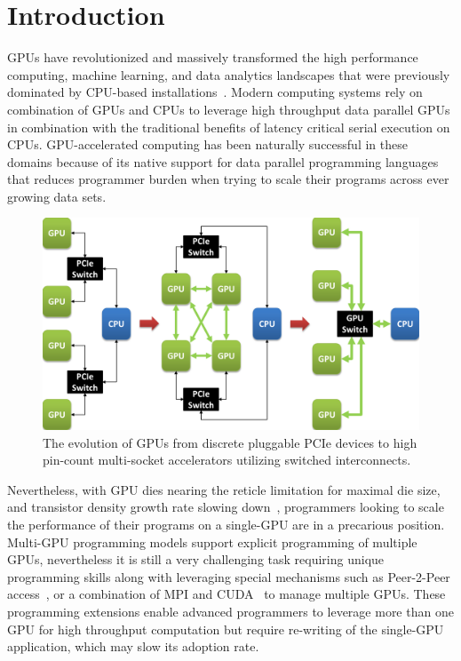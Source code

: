\section{Introduction}
\label{introduction}

GPUs have revolutionized and massively transformed the high
performance computing, machine learning, and data analytics landscapes that were
previously dominated by CPU-based
installations~\cite{pascal,intersect360,cudnn,Lavin15b,SimonyanZ14a}. Modern
computing systems rely on combination of GPUs and CPUs to leverage high
throughput data parallel GPUs in combination with the traditional benefits of
latency critical serial execution on CPUs. GPU-accelerated computing has been
naturally successful in these domains because of its native support for data parallel
programming languages~\cite{CUDA7,OPENCL} that reduces programmer burden when
trying to scale their programs across ever growing data sets.

\begin{figure}[t]
\centering
\includegraphics[width=1.0\columnwidth]{figures/inter_gpu_connections.pdf}
\caption{The evolution of GPUs from discrete pluggable PCIe devices to high pin-count 
multi-socket accelerators utilizing switched interconnects.}
\label{fig:systemdiagram}
\vspace{-.15in}
\end{figure}

Nevertheless, with GPU dies nearing the reticle limitation for maximal die
size, and transistor density growth rate slowing down~\cite{mooredead2016},
programmers looking to scale the performance of their programs on a single-GPU
are in a precarious position. Multi-GPU programming models support explicit
programming of multiple GPUs, nevertheless it is still a very challenging task
requiring unique programming skills along with leveraging special mechanisms
such as Peer-2-Peer access~\cite{NVIDIAP2P}, or a combination of MPI and
CUDA~\cite{NVIDIAMPI} to manage multiple GPUs. These programming extensions
enable advanced programmers to leverage more than one GPU for high throughput
computation but require re-writing of the single-GPU application, which may
slow its adoption rate. 

